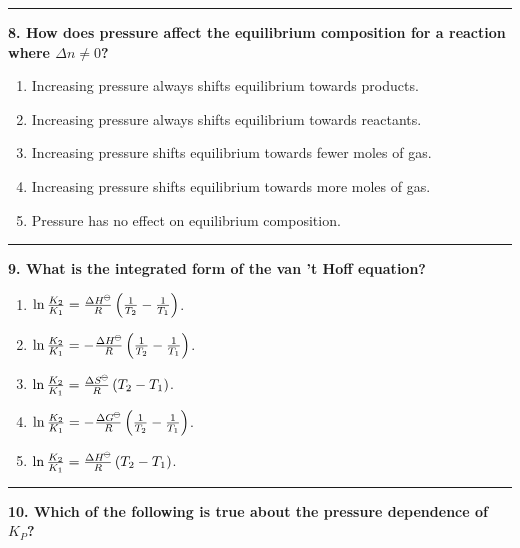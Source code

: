 \documentclass[
  9pt,
]{extbook}
\providecommand{\tightlist}{%
  \setlength{\itemsep}{0pt}\setlength{\parskip}{0pt}}
\theoremstyle{definition}
\theoremstyle{definition}
\theoremstyle{definition}
\theoremstyle{definition}
\theoremstyle{remark}
\begin{document}
\begin{center}\rule{0.5\linewidth}{0.5pt}\end{center}

\textbf{8. How does pressure affect the equilibrium composition for a reaction where \(\Delta n \neq 0\)?}

\begin{enumerate}
\def\labelenumi{\alph{enumi}.}
\tightlist
\item
  Increasing pressure always shifts equilibrium towards products.
\item
  Increasing pressure always shifts equilibrium towards reactants.
\item
  Increasing pressure shifts equilibrium towards fewer moles of gas.
\item
  Increasing pressure shifts equilibrium towards more moles of gas.
\item
  Pressure has no effect on equilibrium composition.
\end{enumerate}

\begin{center}\rule{0.5\linewidth}{0.5pt}\end{center}

\textbf{9. What is the integrated form of the van 't Hoff equation?}

\begin{enumerate}
\def\labelenumi{\alph{enumi}.}
\tightlist
\item
  \(\ln\frac{K_2}{K_1} = \frac{\Delta H^{{-\kern-6pt{\ominus}\kern-6pt-}}}{R}\left(\frac{1}{T_2} - \frac{1}{T_1}\right)\).
\item
  \(\ln\frac{K_2}{K_1} = -\frac{\Delta H^{{-\kern-6pt{\ominus}\kern-6pt-}}}{R}\left(\frac{1}{T_2} - \frac{1}{T_1}\right)\).
\item
  \(\ln\frac{K_2}{K_1} = \frac{\Delta S^{{-\kern-6pt{\ominus}\kern-6pt-}}}{R}\left(T_2 - T_1\right)\).
\item
  \(\ln\frac{K_2}{K_1} = -\frac{\Delta G^{{-\kern-6pt{\ominus}\kern-6pt-}}}{R}\left(\frac{1}{T_2} - \frac{1}{T_1}\right)\).
\item
  \(\ln\frac{K_2}{K_1} = \frac{\Delta H^{{-\kern-6pt{\ominus}\kern-6pt-}}}{R}\left(T_2 - T_1\right)\).
\end{enumerate}

\begin{center}\rule{0.5\linewidth}{0.5pt}\end{center}

\textbf{10. Which of the following is true about the pressure dependence of \(K_P\)?}
\end{document}
